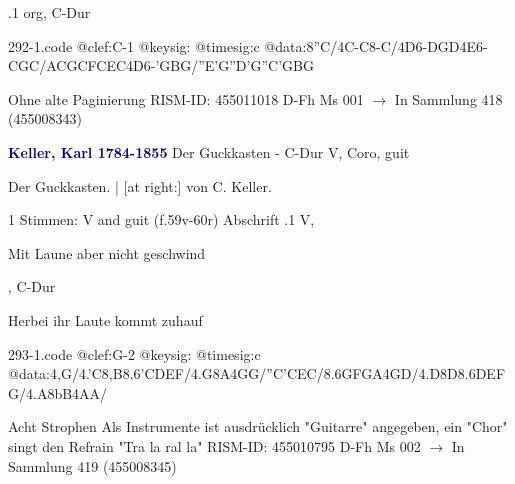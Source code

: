 \documentclass[twocolumn]{book}
\begin{document}
.1  org, C-Dur  
\begin{filecontents*}{292-1.code}
@clef:C-1
@keysig:
@timesig:c
@data:8''C/4C-C8-C/4D6-{DGD}4E6-{CGC}/{ACGC}{FCEC}4D6-{'GBG}/{''E'G''D'G}{''C'GBG}
\end{filecontents*}
\newline
%
\newline Ohne alte Paginierung
\newline RISM-ID: 455011018
\newline D-Fh  Ms 001
\newline $\rightarrow$ In Sammlung 418 (455008343)
      
\newline \par \vspace{7pt} \textcolor{darkblue}{\textbf{Keller, Karl  1784-1855}}
\newline Der Guckkasten - C-Dur
\newline V, Coro, guit
\newline \begin{itshape}[heading, f.59v:] Der Guckkasten. | [at right:] von C. Keller.\end{itshape} 
\newline \textcolor{darkblue}{}  1 Stimmen: V and guit  (f.59v-60r)
\newline Abschrift
.1  V, \begin{itshape}Mit Laune aber nicht geschwind\end{itshape}, C-Dur
\newline \begin{footnotesize} Herbei ihr Laute kommt zuhauf \end{footnotesize}  
\begin{filecontents*}{293-1.code}
@clef:G-2
@keysig:
@timesig:c
@data:4,G/4.'C8,B{8.6'CD}{EF}/4.G8A4GG/''C'CEC/8.6{GF}GA4GD/4.D8D{8.6DE}{FG}/4.A8bB4AA/
\end{filecontents*}
\newline
%
\newline Acht Strophen
\newline Als Instrumente ist ausdrücklich "Guitarre" angegeben, ein "Chor" singt den Refrain "Tra la ral la"
\newline RISM-ID: 455010795
\newline D-Fh  Ms 002
\newline $\rightarrow$ In Sammlung 419 (455008345)
      
\end{document}
